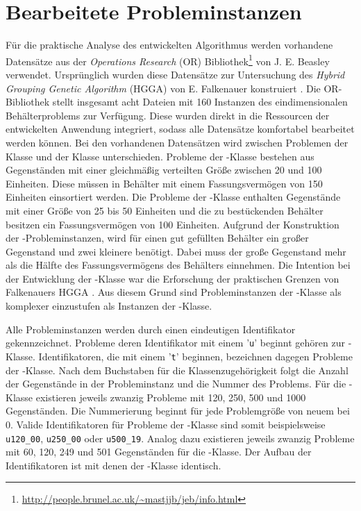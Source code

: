     \section{Bearbeitete Probleminstanzen}
    Für die praktische Analyse des entwickelten Algorithmus werden vorhandene Datensätze aus der \textit{Operations Research} (OR) Bibliothek\footnote{\url{http://people.brunel.ac.uk/~mastjjb/jeb/info.html}} von J. E. Beasley verwendet. Ursprünglich wurden diese Datensätze zur Untersuchung des \textit{Hybrid Grouping Genetic Algorithm} (HGGA) von E. Falkenauer konstruiert \parencite{Falkenauer:1996}. Die OR-Bibliothek stellt insgesamt acht Dateien mit 160 Instanzen des eindimensionalen Behälterproblems zur Verfügung. Diese wurden direkt in die Ressourcen der entwickelten Anwendung integriert, sodass alle Datensätze komfortabel bearbeitet werden können. Bei den vorhandenen Datensätzen wird zwischen Problemen der Klasse \uniform und der Klasse \triplets unterschieden. Probleme der \uniform-Klasse bestehen aus Gegenständen mit einer gleichmäßig verteilten Größe zwischen 20 und 100 Einheiten. Diese müssen in Behälter mit einem Fassungsvermögen von 150 Einheiten einsortiert werden. Die Probleme der \triplets-Klasse enthalten Gegenstände mit einer Größe von 25 bis 50 Einheiten und die zu bestückenden Behälter besitzen ein Fassungsvermögen von 100 Einheiten. Aufgrund der Konstruktion der \triplets-Probleminstanzen, wird für einen gut gefüllten Behälter ein großer Gegenstand und zwei kleinere benötigt. Dabei muss der große Gegenstand mehr als die Hälfte des Fassungsvermögens des Behälters einnehmen. Die Intention bei der Entwicklung der \triplets-Klasse war die Erforschung der praktischen Grenzen von Falkenauers HGGA \parencite[17]{Falkenauer:1996}. Aus diesem Grund sind Probleminstanzen der \triplets-Klasse als komplexer einzustufen als Instanzen der \uniform-Klasse.

    Alle Probleminstanzen werden durch einen eindeutigen Identifikator gekennzeichnet. Probleme deren Identifikator mit einem '\texttt{u}' beginnt gehören zur \uniform-Klasse. Identifikatoren, die mit einem '\texttt{t}' beginnen, bezeichnen dagegen Probleme der \triplets-Klasse. Nach dem Buchstaben für die Klassenzugehörigkeit folgt die Anzahl der Gegenstände in der Probleminstanz und die Nummer des Problems. Für die \uniform-Klasse existieren jeweils zwanzig Probleme mit 120, 250, 500 und 1000 Gegenständen. Die Nummerierung beginnt für jede Problemgröße von neuem bei 0. Valide Identifikatoren für Probleme der \uniform-Klasse sind somit beispielsweise \texttt{u120\_00}, \texttt{u250\_00} oder \texttt{u500\_19}. Analog dazu existieren jeweils zwanzig Probleme mit 60, 120, 249 und 501 Gegenständen für die \triplets-Klasse. Der Aufbau der Identifikatoren ist mit denen der \uniform-Klasse identisch.

